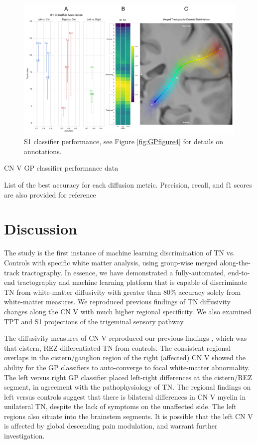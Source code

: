 \begin{figure}[ht]
\centering
\includegraphics[width=\linewidth]{figure-GP-S1.pdf}
\caption{S1 classifier performance, see Figure \ref{fig:GPfigure4} for details on annotations.}
\label{fig:GPfigure5}
\end{figure}

\begin{table}[ht]
\centering
{}
\caption{CN V GP classifier performance data}
\caption*{List of the best accuracy for each diffusion metric. Precision, recall, and f1 scores are also provided for reference}
\label{table:CN V}
\end{table}

\section{Discussion}
The study is the first instance of machine learning discrimination of TN vs. Controls with specific white matter analysis, using group-wise merged along-the-track tractography. In essence, we have demonstrated a fully-automated, end-to-end tractography and machine learning platform that is capable of discriminate TN from white-matter diffusivity with greater than 80\% accuracy solely from white-matter measures. We reproduced previous findings of TN diffusivity changes along the CN V with much higher regional specificity. We also examined TPT and S1 projections of the trigeminal sensory pathway.

The diffusivity measures of CN V reproduced our previous findings \cite{Chen2016a}, which was that cistern, REZ differentiated TN from controls. The consistent regional overlaps in the cistern/ganglion region of the right (affected) CN V showed the ability for the GP classifiers to auto-converge to focal white-matter abnormality. The left versus right GP classifier placed left-right differences at the cistern/REZ segment, in agreement with the pathophysiology of TN. The regional findings on left versus controls suggest that there is bilateral differences in CN V myelin in unilateral TN, despite the lack of symptoms on the unaffected side. The left regions also situate into the brainstem segments. It is possible that the left CN V is affected by global descending pain modulation, and warrant further investigation. 

